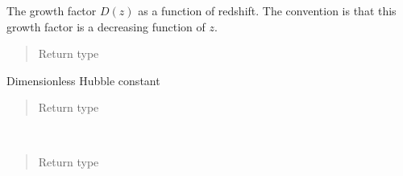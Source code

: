 \documentclass[letterpaper,10pt,english]{sphinxmanual}
\begin{document}
\begin{fulllineitems}
\begin{fulllineitems}
\begin{quote}
\begin{description}
\end{description}\end{quote}

\end{fulllineitems}


\begin{fulllineitems}
\label{\detokenize{api/seyfert.cosmology.cosmology.Cosmology:seyfert.cosmology.cosmology.Cosmology.growth_factor_z}}
\sphinxAtStartPar
The growth factor \(D(z)\) as a function of redshift. The convention is that this growth factor is a
decreasing function of \(z\).
\begin{quote}\begin{description}
\item[{Return type}] \leavevmode
\sphinxAtStartPar
{}

\end{description}\end{quote}

\end{fulllineitems}


\begin{fulllineitems}
\label{\detokenize{api/seyfert.cosmology.cosmology.Cosmology:seyfert.cosmology.cosmology.Cosmology.h}}
\sphinxAtStartPar
Dimensionless Hubble constant
\begin{quote}\begin{description}
\item[{Return type}] \leavevmode
\sphinxAtStartPar
{}

\end{description}\end{quote}

\end{fulllineitems}


\begin{fulllineitems}
\label{\detokenize{api/seyfert.cosmology.cosmology.Cosmology:seyfert.cosmology.cosmology.Cosmology.k_grid}}~\begin{quote}\begin{description}
\item[{Return type}] \leavevmode
\sphinxAtStartPar
{}


\end{description}
\end{quote}
\end{fulllineitems}
\end{fulllineitems}
\end{document}
